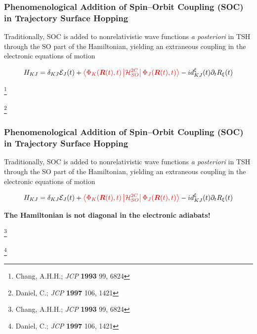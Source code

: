 \documentclass[usepdftitle=false,10pt]{beamer}
\newcommand{\innerop}[3]{\left\langle #1 \left\vert #2 \right\vert #3 \right\rangle}  %
\newcommand*\vc[1]{\boldsymbol{#1}}
\newcommand\blfootnote[1]{%
  \begingroup
  \renewcommand\thefootnote{}\footnote{#1}%
  \addtocounter{footnote}{-1}%
  \endgroup
}
\begin{document}
\begin{frame}
  \frametitle{Phenomenological Addition of Spin--Orbit Coupling (SOC) in
  Trajectory Surface Hopping}

  Traditionally, SOC is added to nonrelativistic wave functions 
  \emph{a posteriori} in TSH through the SO part of the 
  Hamiltonian, yielding an extraneous coupling in the electronic equations of motion

%

  \begin{equation*}
    H_{KJ} = \delta_{KJ}\mathcal{E}_J(t) +
    {\color{red}
      \innerop{\Phi_K(\vc{R}(t),t)}{\mathcal{H}_{SO}^{2C}}{\Phi_J(\vc{R}(t),t)}
    }
    - i d_{KJ}^\xi (t) \partial_t R_{\xi}(t) 
  \end{equation*}

  \vfill
  \blfootnote{\tiny Chang, A.H.H.; \emph{JCP} \textbf{1993} 99, 6824}
  \blfootnote{\tiny Daniel, C.; \emph{JCP} \textbf{1997} 106, 1421}
\end{frame}

\begin{frame}
  \frametitle{Phenomenological Addition of Spin--Orbit Coupling (SOC) in
  Trajectory Surface Hopping}

  Traditionally, SOC is added to nonrelativistic wave functions 
  \emph{a posteriori} in TSH through the SO part of the 
  Hamiltonian, yielding an extraneous coupling in the electronic equations of motion

%

  \begin{equation*}
    H_{KJ} = \delta_{KJ}\mathcal{E}_J(t) +
    {\color{red}
      \innerop{\Phi_K(\vc{R}(t),t)}{\mathcal{H}_{SO}^{2C}}{\Phi_J(\vc{R}(t),t)}
    }
    - i d_{KJ}^\xi (t) \partial_t R_{\xi}(t) 
  \end{equation*}

  \vfill
  \begin{center}
  {\LARGE \bf The Hamiltonian is not diagonal in the electronic adiabats!}
  \end{center}
  \blfootnote{\tiny Chang, A.H.H.; \emph{JCP} \textbf{1993} 99, 6824}
  \blfootnote{\tiny Daniel, C.; \emph{JCP} \textbf{1997} 106, 1421}
\end{frame}
\end{document}
